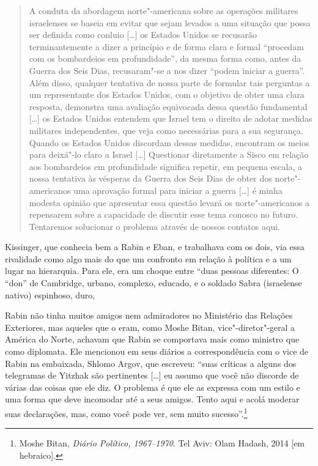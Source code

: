 \begin{quote}
A conduta da abordagem norte"-americana sobre as operações militares
israelenses se baseia em evitar que sejam levados a uma situação que
possa ser definida como conluio {[}\ldots{}{]} os Estados Unidos se recusarão
terminantemente a dizer a princípio e de forma clara e formal ``procedam
com os bombardeios em profundidade'', da mesma forma como, antes da
Guerra dos Seis Dias, recusaram"-se a nos dizer ``podem iniciar a
guerra''. Além disso, qualquer tentativa de nossa parte de formular tais
perguntas a um representante dos Estados Unidos, com o objetivo de obter
uma clara resposta, demonstra uma avaliação equivocada dessa questão
fundamental {[}\ldots{}{]} os Estados Unidos entendem que Israel tem o direito de adotar medidas
militares independentes, que veja como necessárias para a sua segurança.
Quando os Estados Unidos discordam dessas medidas, encontram os meios
para deixá"-lo claro a Israel {[}\ldots{}{]} Questionar diretamente a Sisco em
relação aos bombardeios em profundidade significa repetir, em pequena
escala, a nossa tentativa às vésperas da Guerra dos Seis Dias de obter
dos norte"-americanos uma aprovação formal para iniciar a guerra {[}\ldots{}{]} é
minha modesta opinião que apresentar essa questão levará os
norte"-americanos a repensarem sobre a capacidade de discutir esse tema
conosco no futuro. Tentaremos solucionar o problema através de nossos
contatos aqui.
\end{quote}

Kissinger, que conhecia bem a Rabin e Eban, e trabalhava com os dois,
via essa rivalidade como algo mais do que um confronto em relação à
política e a um lugar na hierarquia. Para ele, era um choque entre ``duas
pessoas diferentes: O ``don'' de Cambridge, urbano, complexo, educado, e
o soldado Sabra (israelense nativo) espinhoso, duro,

Rabin não tinha muitos amigos nem admiradores no Ministério das Relações
Exteriores, mas aqueles que o eram, como Moshe Bitan, vice"-diretor"-geral
a América do Norte, achavam que Rabin se comportava mais como
ministro que como diplomata. Ele mencionou em seus diários a
correspondência com o vice de Rabin na embaixada, Shlomo Argov, que
escreveu: ``suas críticas a alguns dos telegramas de Yitzhak são
pertinentes {[}\ldots{}{]} eu assumo que você não discorde de várias das coisas que
ele diz. O problema é que ele as expressa com um estilo e uma forma que
deve incomodar até a seus amigos. Tento aqui e acolá moderar suas
declarações, mas, como você pode ver, sem muito sucesso''.\footnote{Moshe Bitan, \textit{Diário Político, 1967--1970}. Tel Aviv: Olam Hadash, 2014 {[}em
hebraico{]}.}

